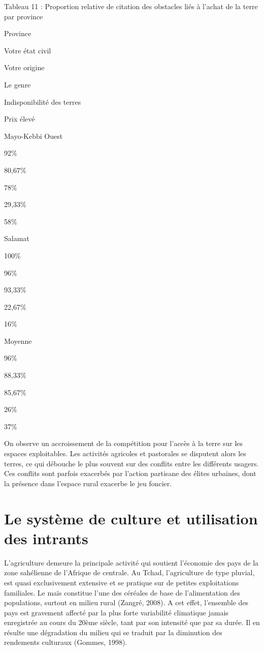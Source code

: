 \documentclass[12pt,oneside]{report}
\begin{document}
Tableau 11 : Proportion relative de citation des obstacles liés à l’achat de la terre par province

Province

Votre état civil

Votre origine

Le genre

Indisponibilité des terres

Prix élevé

Mayo-Kebbi Ouest

92\%

80,67\%

78\%

29,33\%

58\%

Salamat

100\%

96\%

93,33\%

22,67\%

16\%

Moyenne

96\%

88,33\%

85,67\%

26\%

37\%

On observe un accroissement de la compétition pour l’accès à la terre sur les espaces exploitables. Les activités agricoles et pastorales se disputent alors les terres, ce qui débouche le plus souvent sur des conflits entre les différents usagers. Ces conflits sont parfois exacerbés par l’action partisane des élites urbaines, dont la présence dans l’espace rural exacerbe le jeu foncier.

\section{Le système de culture et utilisation des intrants}
L’agriculture demeure la principale activité qui soutient l’économie des pays de la zone sahélienne de l’Afrique de centrale. Au Tchad, l’agriculture de type pluvial, est quasi exclusivement extensive et se pratique sur de petites exploitations familiales. Le maïs constitue l’une des céréales de base de l’alimentation des populations, surtout en milieu rural (Zangré, 2008). A cet effet, l’ensemble des pays est gravement affecté par la plus forte variabilité climatique jamais enregistrée au cours du 20ème siècle, tant par son intensité que par sa durée. Il en résulte une dégradation du milieu qui se traduit par la diminution des rendements culturaux (Gommes, 1998).
\end{document}
